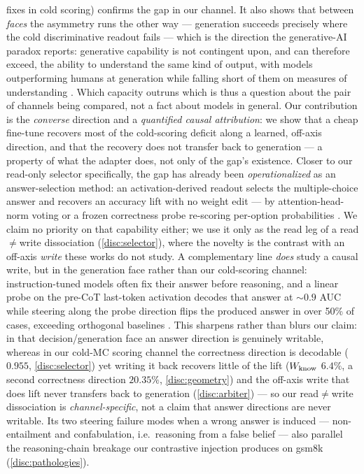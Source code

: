 fixes in cold scoring) confirms the gap in our channel. It also shows that between
\emph{faces} the asymmetry runs the other way --- generation succeeds precisely where
the cold discriminative readout fails --- which is the direction the generative-AI
paradox reports: generative capability is not contingent upon, and can therefore
exceed, the ability to understand the same kind of output, with models outperforming
humans at generation while falling short of them on measures of understanding
\citep{GenerativeAIParadox}. Which capacity outruns which is thus a question about the
pair of channels being compared, not a fact about models in general. Our contribution is the
\emph{converse} direction and a \emph{quantified causal attribution}: we show that a
cheap fine-tune recovers most of the cold-scoring deficit along a learned, off-axis
direction, and that the recovery does not transfer back to generation --- a property
of what the adapter does, not only of the gap's existence. Closer to our read-only
selector specifically, the gap has already been \emph{operationalized} as an
answer-selection method: an activation-derived readout selects the multiple-choice
answer and recovers an accuracy lift with no weight edit --- by attention-head-norm
voting \citep{NoVo} or a frozen correctness probe re-scoring per-option
probabilities \citep{CORAL}. We claim no priority on that capability either; we use
it only as the read leg of a read${\neq}$write dissociation (\cref{disc:selector}),
where the novelty is the contrast with an off-axis \emph{write} these works do not
study. A complementary line \emph{does} study a causal write, but in the generation
face rather than our cold-scoring channel: instruction-tuned models often fix their
answer before reasoning, and a linear probe on the pre-CoT last-token activation
decodes that answer at ${\sim}0.9$ AUC while steering along the probe direction
flips the produced answer in over 50\% of cases, exceeding orthogonal baselines
\citep{PreCoTAnswer}. This sharpens rather than blurs our claim: in that
decision/generation face an answer direction is genuinely writable, whereas in our
cold-MC scoring channel the correctness direction is decodable ($0.955$,
\cref{disc:selector}) yet writing it back recovers little of the lift ($W_{\mathrm{know}}$
$6.4\%$, a second correctness direction $20.35\%$, \cref{disc:geometry}) and the off-axis write that does lift never transfers back to
generation (\cref{disc:arbiter}) --- so our read${\neq}$write dissociation is
\emph{channel-specific}, not a claim that answer directions are never writable. Its
two steering failure modes when a wrong answer is induced --- non-entailment and
confabulation, i.e.\ reasoning from a false belief --- also parallel the
reasoning-chain breakage our contrastive injection produces on gsm8k
(\cref{disc:pathologies}).

